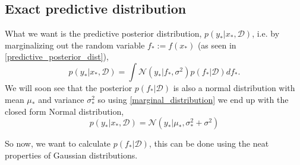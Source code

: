 \subsection{Exact predictive distribution}
What we want is the predictive posterior distribution, $p(y_*|x_*, \mathcal{D})$, i.e. by
marginalizing out the random variable $f_* := f(x_*)$ (as seen in
\eqref{predictive_posterior_dist}),
\begin{equation}\label{GP_predictive}
    p(y_*|x_*,\mathcal{D}) = \int \mathcal{N}(y_*|f_*, \sigma^2) p(f_*|\mathcal{D})df_*.
\end{equation}
We will soon see that the posterior $p(f_*|\mathcal{D})$ is also a normal distribution 
with mean $\mu_*$ and variance $\sigma^2_*$ so
using \eqref{marginal_distribution} we end up with the closed form Normal distribution, 
$$p(y_*|x_*,\mathcal{D}) = \mathcal{N}(y_*|\mu_*,\sigma^2_*+\sigma^2)$$

So now, we want to calculate $p(f_*|\mathcal{D})$, this can be done using the neat properties of Gaussian
distributions.  
